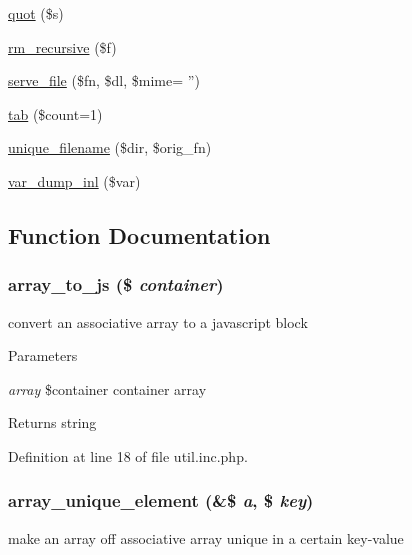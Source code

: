 \begin{DoxyCompactItemize}
\item 
\hyperlink{util_8inc_8php_a3c7d87c658499c1559a6b98cac06f58d}{quot} (\$s)
\item 
\hyperlink{util_8inc_8php_aea325eb074a103f961fdabadbc5e4fb6}{rm\_\-recursive} (\$f)
\item 
\hyperlink{util_8inc_8php_a43278b320bd522e46bd7abdd3a2f6fb0}{serve\_\-file} (\$fn, \$dl, \$mime= '')
\item 
\hyperlink{util_8inc_8php_a74e38925e7162356a2ea14db32664c37}{tab} (\$count=1)
\item 
\hyperlink{util_8inc_8php_a187670bae118aa2d4864c513a21e712d}{unique\_\-filename} (\$dir, \$orig\_\-fn)
\item 
\hyperlink{util_8inc_8php_aa5cc9d5f8a0b5bb76dfe3d15796e5940}{var\_\-dump\_\-inl} (\$var)
\end{DoxyCompactItemize}


\subsection{Function Documentation}
\hypertarget{util_8inc_8php_a61d3b2881d9368741c71509017724bc8}{
\subsubsection[{array\_\-to\_\-js}]{\setlength{\rightskip}{0pt plus 5cm}array\_\-to\_\-js (\$ {\em container})}}
\label{util_8inc_8php_a61d3b2881d9368741c71509017724bc8}
convert an associative array to a javascript block


\begin{DoxyParams}{Parameters}
\item[{\em array}]\$container container array \end{DoxyParams}
\begin{DoxyReturn}{Returns}
string 
\end{DoxyReturn}


Definition at line 18 of file util.inc.php.

\hypertarget{util_8inc_8php_a4647462c98447c6c2842f70d8c313f85}{
\subsubsection[{array\_\-unique\_\-element}]{\setlength{\rightskip}{0pt plus 5cm}array\_\-unique\_\-element (\&\$ {\em a}, \/  \$ {\em key})}}
\label{util_8inc_8php_a4647462c98447c6c2842f70d8c313f85}
make an array off associative array unique in a certain key-\/value


